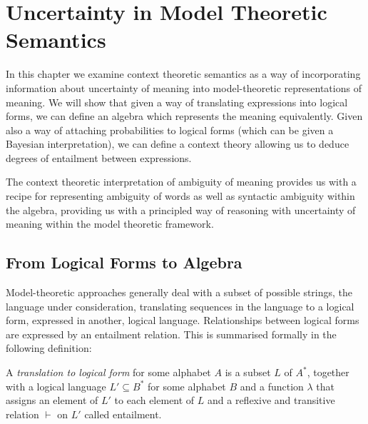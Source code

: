 \documentclass[12pt]{report}
\begin{document}
\chapter{Uncertainty in Model Theoretic Semantics}

In this chapter we examine context theoretic semantics as a way of incorporating information about uncertainty of meaning into model-theoretic representations of meaning. We will show that given a way of translating expressions into logical forms, we can define an algebra which represents the meaning equivalently. Given also a way of attaching probabilities to logical forms (which can be given a Bayesian interpretation), we can define a context theory allowing us to deduce degrees of entailment between expressions.

The context theoretic interpretation of ambiguity of meaning provides us with a recipe for representing ambiguity of words as well as syntactic ambiguity within the algebra, providing us with a principled way of reasoning with uncertainty of meaning within the model theoretic framework.

\section{From Logical Forms to Algebra}

Model-theoretic approaches generally deal with a subset of possible strings, the language under consideration, translating sequences in the language to a logical form, expressed in another, logical language. Relationships between logical forms are expressed by an entailment relation. This is summarised formally in the following definition:
\begin{defn}
A \emph{translation to logical form} for some alphabet $A$ is a subset $L$ of $A^*$, together with a logical language $L' \subseteq B^*$ for some alphabet $B$ and a function $\lambda$ that assigns an element of $L'$ to each element of $L$ and a reflexive and transitive relation $\vdash$ on $L'$ called entailment.
\end{defn}
\end{document}
